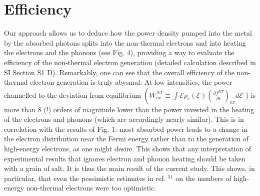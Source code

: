 \documentclass[10pt]{article}
\begin{document}
\section*{Efficiency}
Our approach allows us to deduce how the power density pumped into the metal by the absorbed photons splits into the non-thermal electrons and into heating the electrons and the phonons (see Fig. 4), providing a way to evaluate the efficiency of the non-thermal electron generation (detailed calculation described in SI Section S1 D). Remarkably, one can see that the overall efficiency of the non-thermal electron generation is truly abysmal: At low intensities, the power channelled to the deviation from equilibrium $\left(W_{e x}^{N T} \equiv \int \mathcal{E} \rho_{e}(\mathcal{E})\left(\frac{\partial f^{N T}}{\partial t}\right)_{e x} d \mathcal{E}\right.$ ) is more than 8 (!) orders of magnitude lower than the power invested in the heating of the electrons and phonons (which are accordingly nearly similar). This is in correlation with the results of Fig. 1: most absorbed power leads to a change in the electron distribution near the Fermi energy rather than to the generation of high-energy electrons, as one might desire. This shows that any interpretation of experimental results that ignores electron and phonon heating should be taken with a grain of salt. It is thus the main result of the current study. This shows, in particular, that even the pessimistic estimates in ref. ${ }^{51}$ on the numbers of high-energy non-thermal electrons were too optimistic.
\end{document}
